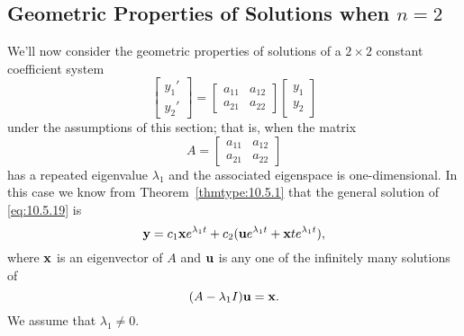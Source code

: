 \documentclass{ximera}
\begin{document}
\subsection*{Geometric Properties of Solutions when  $n=2$}
We'll now  consider the geometric properties of solutions of a
$2\times 2$ constant coefficient system
\begin{equation} \label{eq:10.5.19}
\begin{bmatrix}y_1'\\y_2'\end{bmatrix}=\begin{bmatrix}a_{11}&a_{12}\\a_{21}&a_{22}
\end{bmatrix}\begin{bmatrix}y_1\\y_2\end{bmatrix}
\end{equation}
under the assumptions of this section; that is, when the matrix
$$
A=\begin{bmatrix}a_{11}&a_{12}\\a_{21}&a_{22}
\end{bmatrix}
$$
has a repeated eigenvalue $\lambda_1$ and the associated eigenspace is
one-dimensional. In this case we know from Theorem~\ref{thmtype:10.5.1}
that the general solution of \eqref{eq:10.5.19} is
\begin{equation} \label{eq:10.5.20}
{\bf y}=c_1{\bf x}e^{\lambda_1t}+c_2({\bf u}e^{\lambda_1t}+{\bf
x}te^{\lambda_1t}),
\end{equation}
where ${\bf x}$ is an eigenvector of $A$ and ${\bf u}$ is any one of
the infinitely many solutions of
\begin{equation} \label{eq:10.5.21}
(A-\lambda_1I){\bf u}={\bf x}.
\end{equation}
We assume that $\lambda_1\neq0$.

\begin{center}
\end{center}
\end{document}
